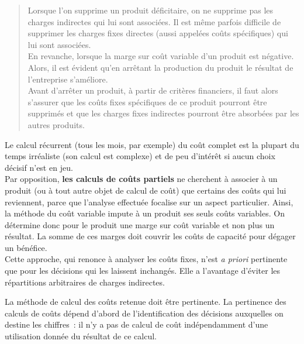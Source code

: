 \documentclass{tufte-handout}
\begin{document}
\begin{verse}
\vspace*{1em}
Lorsque l'on supprime un produit déficitaire, on ne supprime pas les charges indirectes qui lui sont associées. Il est même parfois difficile de supprimer les charges fixes directes (aussi appelées coûts spécifiques) qui lui sont associées.\\
\vspace*{1em}
En revanche, lorsque la marge sur coût variable d'un produit est négative. Alors, il est évident qu'en arrêtant la production du produit le résultat de l'entreprise s'améliore.\\
\vspace*{1em}
Avant d'arrêter un produit, à partir de critères financiers, il faut alors s'assurer que les coûts fixes spécifiques de ce produit pourront être supprimés et que les charges fixes indirectes pourront être absorbées par les autres produits.\\
\end{verse}

Le calcul récurrent (tous les mois, par exemple) du coût complet est la plupart du temps irréaliste (son calcul est complexe) et de peu d'intérêt si aucun choix décisif n'est en jeu.\\

Par opposition, \textbf{les calculs de coûts partiels} ne cherchent à associer à un produit (ou à tout autre objet de calcul de coût) que certains des coûts qui lui reviennent, parce que l'analyse effectuée focalise sur un aspect particulier. Ainsi, la méthode du coût variable impute à un produit ses seuls coûts variables. On détermine donc pour le produit une marge sur coût variable et non plus un résultat. La somme de ces marges doit couvrir les coûts de capacité pour dégager un bénéfice.\\
Cette approche, qui renonce à analyser les coûts fixes, n'est \emph{a priori} pertinente que pour les décisions qui les laissent inchangés. Elle a l'avantage d'éviter les répartitions arbitraires de charges indirectes.\\

\begin{warning}
La méthode de calcul des coûts retenue doit être pertinente. La pertinence des calculs de coûts dépend d'abord de l'identification des décisions auxquelles on destine les chiffres : il n'y a pas de calcul de coût indépendamment d'une utilisation donnée du résultat de ce calcul.\\
\end{warning}
\end{document}
